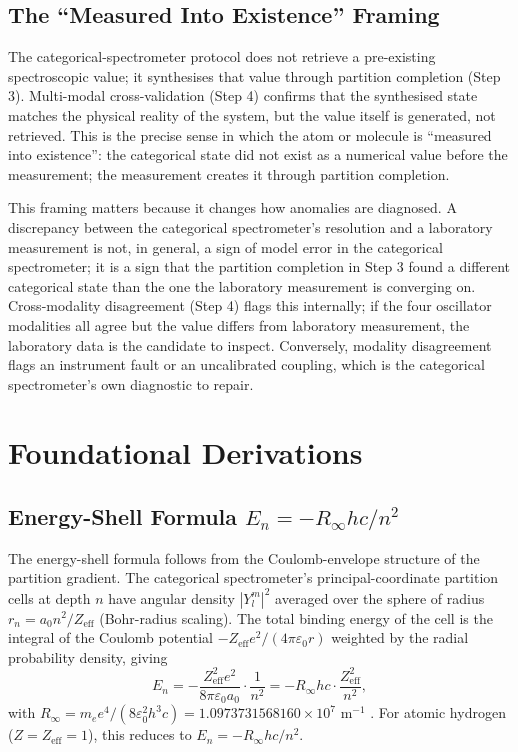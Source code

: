 \documentclass[11pt,a4paper]{article}
\theoremstyle{stmtstyle}
\theoremstyle{definition}
\theoremstyle{remark}
\begin{document}
\subsection{The ``Measured Into Existence'' Framing}

The categorical-spectrometer protocol does not retrieve a pre-existing spectroscopic value; it synthesises that value through partition completion (Step 3). Multi-modal cross-validation (Step 4) confirms that the synthesised state matches the physical reality of the system, but the value itself is generated, not retrieved. This is the precise sense in which the atom or molecule is ``measured into existence'': the categorical state did not exist as a numerical value before the measurement; the measurement creates it through partition completion.

This framing matters because it changes how anomalies are diagnosed. A discrepancy between the categorical spectrometer's resolution and a laboratory measurement is not, in general, a sign of model error in the categorical spectrometer; it is a sign that the partition completion in Step 3 found a different categorical state than the one the laboratory measurement is converging on. Cross-modality disagreement (Step 4) flags this internally; if the four oscillator modalities all agree but the value differs from laboratory measurement, the laboratory data is the candidate to inspect. Conversely, modality disagreement flags an instrument fault or an uncalibrated coupling, which is the categorical spectrometer's own diagnostic to repair.

\section{Foundational Derivations}
\label{sec:methods_derivations}

\subsection{Energy-Shell Formula $E_{n} = -R_{\infty} hc / n^{2}$}

The energy-shell formula follows from the Coulomb-envelope structure of the partition gradient. The categorical spectrometer's principal-coordinate partition cells at depth $n$ have angular density $|Y_{l}^{m}|^{2}$ averaged over the sphere of radius $r_{n} = a_{0} n^{2} / Z_{\mathrm{eff}}$ (Bohr-radius scaling). The total binding energy of the cell is the integral of the Coulomb potential $-Z_{\mathrm{eff}} e^{2}/(4\pi\varepsilon_{0} r)$ weighted by the radial probability density, giving
\begin{equation}
E_{n} = -\frac{Z_{\mathrm{eff}}^{2} e^{2}}{8\pi\varepsilon_{0} a_{0}} \cdot \frac{1}{n^{2}} = -R_{\infty} hc \cdot \frac{Z_{\mathrm{eff}}^{2}}{n^{2}},
\end{equation}
with $R_{\infty} = m_{e} e^{4}/(8\varepsilon_{0}^{2} h^{3} c) = 1.0973731568160 \times 10^{7}$ m$^{-1}$ \citep{codata2022}. For atomic hydrogen ($Z = Z_{\mathrm{eff}} = 1$), this reduces to $E_{n} = -R_{\infty} hc / n^{2}$.
\end{document}
